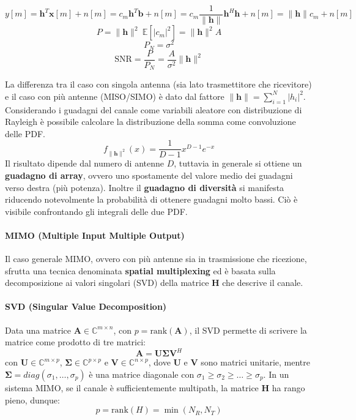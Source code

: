 \[
    y[m] = \mathbf{h}^T \mathbf{x}[m] + n[m] = c_m \mathbf{h}^T \mathbf{b} + n[m] = c_m \frac{1}{\|\mathbf{h}\|} \mathbf{h}^H \mathbf{h} + n[m] = \| \mathbf{h} \| c_m + n[m]
\]
\[
    P = \|\mathbf{h} \|^2 \ \mathbb{E} \left[\left| c_m \right|^2 \right] = \|\mathbf{h} \|^2  A
\]
\[
    P_N = \sigma^2  
\]
\[
    \text{SNR} = \frac{P}{P_N} = \frac{A}{\sigma^2} \|\mathbf{h}\|^2 
\]

La differenza tra il caso con singola antenna (sia lato trasmettitore che ricevitore) e il caso con più antenne (MISO/SIMO) è dato dal fattore $\| \mathbf{h} \| = \sum_{i=1}^{N} |h_i|^2$.
Considerando i guadagni del canale come variabili aleatore con distribuzione di Rayleigh è possibile calcolare la distribuzione della somma come convoluzione delle PDF.
\[
    f_{\| \mathbf{h} \|^2} (x) = \frac{1}{D-1} x^{D-1} e^{-x}
\]
Il risultato dipende dal numero di antenne $D$, tuttavia in generale si ottiene un \textbf{guadagno di array}, ovvero uno spostamente del valore medio dei guadagni verso destra (più potenza).
Inoltre il \textbf{guadagno di diversità} si manifesta riducendo notevolmente la probabilità di ottenere guadagni molto bassi.
Ciò è visibile confrontando gli integrali delle due PDF.

\paragraph*{MIMO (Multiple Input Multiple Output)}

Il caso generale MIMO, ovvero con più antenne sia in trasmissione che ricezione, sfrutta una tecnica denominata \textbf{spatial multiplexing} ed è basata sulla decomposizione ai valori singolari (SVD) della matrice $\mathbf{H}$ che descrive il canale.

\paragraph*{SVD (Singular Value Decomposition)}

Data una matrice $\mathbf{A} \in \mathbb{C}^{m \times n}$, con  $p = \text{rank} (\mathbf{A})$, il SVD permette di scrivere la matrice come prodotto di tre matrici:
\[
    \mathbf{A} = \mathbf{U} \mathbf{\Sigma} \mathbf{V}^H
\]
con $\mathbf{U} \in \mathbb{C}^{m \times p}$, $\mathbf{\Sigma} \in \mathbb{C}^{p \times p}$ e $\mathbf{V} \in \mathbb{C}^{n \times p}$,
dove $\mathbf{U}$ e $\mathbf{V}$ sono matrici unitarie, mentre $\mathbf{\Sigma} = diag(\sigma_1, \ldots, \sigma_p)$ è una matrice diagonale con $\sigma_1 \geq \sigma_2 \geq \ldots \geq \sigma_p$. In un sistema MIMO, se il canale è sufficientemente multipath, la matrice $\mathbf{H}$ ha rango pieno, dunque:
\[
    p = \text{rank}(H) = \min(N_R, N_T)
\]

